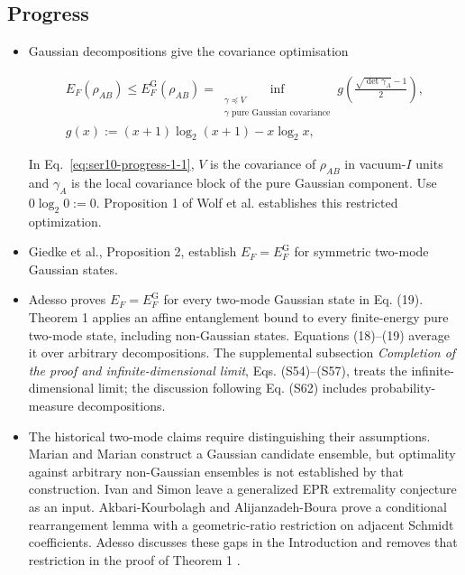 \subsection*{Progress}

\begin{itemize}
  \item Gaussian decompositions give the covariance optimisation

\begin{equation}
\begin{gathered}
E_F(\rho_{AB})\leq E_F^{\mathrm G}(\rho_{AB})
=\inf_{\substack{\gamma\preceq V\\\gamma\text{ pure Gaussian covariance}}}
g\!\left(\frac{\sqrt{\det\gamma_A}-1}{2}\right),
\\ g(x):=(x+1)\log_2(x+1)-x\log_2x,
\end{gathered}
\label{eq:ser10-progress-1-1}
\end{equation}

In Eq.~\eqref{eq:ser10-progress-1-1}, $V$ is the covariance of $\rho_{AB}$ in vacuum-$I$ units and $\gamma_A$ is the local covariance block of the pure Gaussian component. Use $0\log_2 0:=0$. Proposition 1 of Wolf et al. establishes this restricted optimization. 

  \item Giedke et al., Proposition 2, establish $E_F=E_F^{\mathrm G}$ for symmetric two-mode Gaussian states. 

  \item Adesso proves $E_F=E_F^{\mathrm G}$ for every two-mode Gaussian state in Eq. (19). Theorem 1 applies an affine entanglement bound to every finite-energy pure two-mode state, including non-Gaussian states. Equations (18)--(19) average it over arbitrary decompositions. The supplemental subsection \emph{Completion of the proof and infinite-dimensional limit}, Eqs. (S54)--(S57), treats the infinite-dimensional limit; the discussion following Eq. (S62) includes probability-measure decompositions. 

  \item The historical two-mode claims require distinguishing their assumptions. Marian and Marian construct a Gaussian candidate ensemble, but optimality against arbitrary non-Gaussian ensembles is not established by that construction. Ivan and Simon leave a generalized EPR extremality conjecture as an input. Akbari-Kourbolagh and Alijanzadeh-Boura prove a conditional rearrangement lemma with a geometric-ratio restriction on adjacent Schmidt coefficients. Adesso discusses these gaps in the Introduction and removes that restriction in the proof of Theorem 1 .
\end{itemize}

